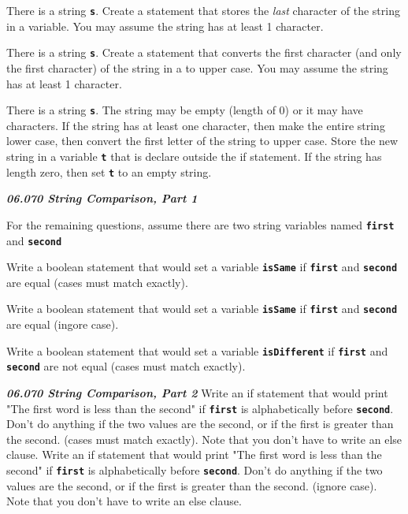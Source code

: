 \documentclass[letterpaper,11pt]{exam}
\newcommand{\videoheading}[1]{\Large\textbf{\textit{#1}}}
\begin{document}
\begin{questions}
\question There is a string \texttt{\textbf{s}}.  Create a statement that stores the \textit{last} character of the string in a variable.  You may assume the string has at least 1 character.
\vspace{1cm}

\question There is a string \texttt{\textbf{s}}.  Create a statement that converts the first character (and only the first character) of the string in a to upper case.  You may assume the string has at least 1 character.
\vspace{1cm}

\question There is a string \texttt{\textbf{s}}.  The string may be empty (length of 0) or it may have characters.  If the string has at least one character, then make the entire string lower case, then convert the first letter of the string to upper case.  Store the new string in a variable \texttt{\textbf{t}} that is declare outside the if statement.  If the string has length zero, then set \texttt{\textbf{t}} to an empty string.
\vspace{4cm}


\videoheading{06.070 String Comparison, Part 1}

For the remaining questions, assume there are two string variables named \texttt{\textbf{first}} and \texttt{\textbf{second}}

\question Write a boolean statement that would set a variable \texttt{\textbf{isSame}} if \texttt{\textbf{first}} and \texttt{\textbf{second}} are equal (cases must match exactly).
\vspace{1cm}

\question Write a boolean statement that would set a variable \texttt{\textbf{isSame}} if \texttt{\textbf{first}} and \texttt{\textbf{second}} are equal (ingore case).
\vspace{1cm}

\question Write a boolean statement that would set a variable \texttt{\textbf{isDifferent}} if \texttt{\textbf{first}} and \texttt{\textbf{second}} are not equal (cases must match exactly).
\vspace{1cm}

\videoheading{06.070 String Comparison, Part 2}
\question Write an if statement that would print "The first word is less than the second" if \texttt{\textbf{first}} is alphabetically before \texttt{\textbf{second}}.  Don't do anything if the two values are the second, or if the first is greater than the second. (cases must match exactly).  Note that you don't have to write an else clause.
\vspace{1.5cm}
\question Write an if statement that would print "The first word is less than the second" if \texttt{\textbf{first}} is alphabetically before \texttt{\textbf{second}}.  Don't do anything if the two values are the second, or if the first is greater than the second. (ignore case).  Note that you don't have to write an else clause.
\vspace{1.5cm}




\end{questions}
\end{document}
